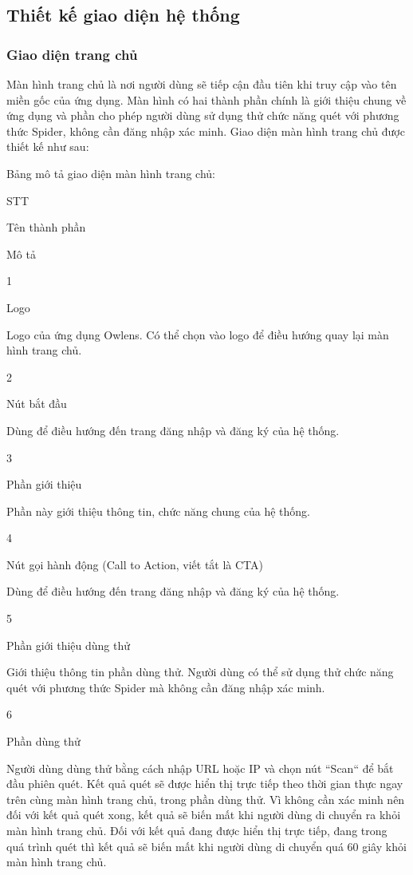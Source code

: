 \subsection{Thiết kế giao diện hệ thống}

\subsubsection{Giao diện trang chủ}

\tab Màn hình trang chủ là nơi người dùng sẽ tiếp cận đầu tiên khi truy cập vào tên miền gốc của ứng dụng.
Màn hình có hai thành phần chính là giới thiệu chung về ứng dụng và phần cho phép người dùng sử dụng thử chức năng quét với phương thức Spider, không cần đăng nhập xác minh.
Giao diện màn hình trang chủ được thiết kế như sau:

Bảng mô tả giao diện màn hình trang chủ:

STT

Tên thành phần

Mô tả

1

Logo

Logo của ứng dụng Owlens. Có thể chọn vào logo để điều hướng quay lại màn hình trang chủ.

2

Nút bắt đầu

Dùng để điều hướng đến trang đăng nhập và đăng ký của hệ thống.

3

Phần giới thiệu

Phần này giới thiệu thông tin, chức năng chung của hệ thống.

4

Nút gọi hành động (Call to Action, viết tắt là CTA)

Dùng để điều hướng đến trang đăng nhập và đăng ký của hệ thống.

5

Phần giới thiệu dùng thử

Giới thiệu thông tin phần dùng thử. Người dùng có thể sử dụng thử chức năng quét với phương thức Spider mà không cần đăng nhập xác minh.

6

Phần dùng thử

Người dùng dùng thử bằng cách nhập URL hoặc IP và chọn nút “Scan“ để bắt đầu phiên quét. Kết quả quét sẽ được hiển thị trực tiếp theo thời gian thực ngay trên cùng màn hình trang chủ, trong phần dùng thử. Vì không cần xác minh nên đối với kết quả quét xong, kết quả sẽ biến mất khi người dùng di chuyển ra khỏi màn hình trang chủ. Đối với kết quả đang được hiển thị trực tiếp, đang trong quá trình quét thì kết quả sẽ biến mất khi người dùng di chuyển quá 60 giây khỏi màn hình trang chủ.

